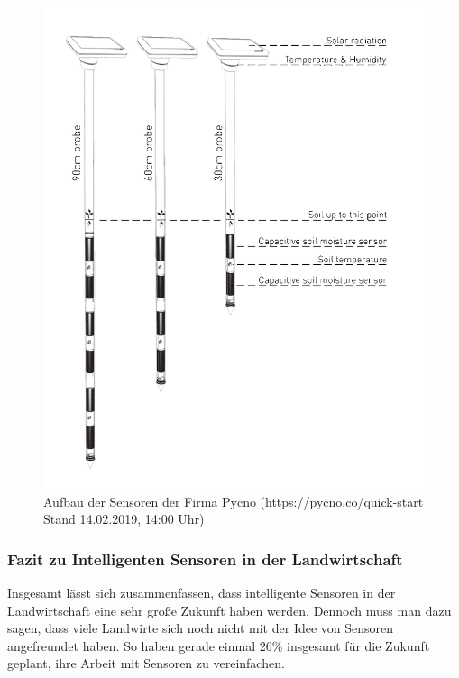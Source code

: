 \documentclass[a4paper,12pt]{scrartcl}
\begin{document}
\begin{figure}[H]
\centering
\includegraphics[scale=0.4]{picture/pycno}
\caption{Aufbau der Sensoren der Firma Pycno (https://pycno.co/quick-start Stand 14.02.2019, 14:00 Uhr)}
\label{fig:Aufbau der Sensoren der Firma Pycno}
\end{figure}
\subsubsection{Fazit zu Intelligenten Sensoren in der Landwirtschaft}
Insgesamt lässt sich zusammenfassen, dass intelligente Sensoren in der Landwirtschaft eine sehr große Zukunft haben werden. Dennoch muss man dazu sagen, dass viele Landwirte sich noch nicht mit der Idee von Sensoren angefreundet haben. So haben gerade einmal 26\% insgesamt für die Zukunft geplant, ihre Arbeit mit Sensoren zu vereinfachen.
\end{document}
